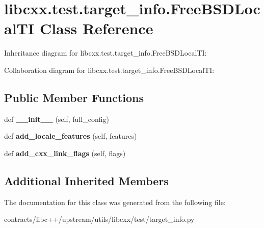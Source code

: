 \hypertarget{classlibcxx_1_1test_1_1target__info_1_1_free_b_s_d_local_t_i}{}\section{libcxx.\+test.\+target\+\_\+info.\+Free\+B\+S\+D\+Local\+TI Class Reference}
\label{classlibcxx_1_1test_1_1target__info_1_1_free_b_s_d_local_t_i}


Inheritance diagram for libcxx.\+test.\+target\+\_\+info.\+Free\+B\+S\+D\+Local\+TI\+:


Collaboration diagram for libcxx.\+test.\+target\+\_\+info.\+Free\+B\+S\+D\+Local\+TI\+:
\subsection*{Public Member Functions}
\begin{DoxyCompactItemize}
\item 
\mbox{\label{classlibcxx_1_1test_1_1target__info_1_1_free_b_s_d_local_t_i_ab0e7411a2cfe7884200d9e982c1601da}} 
def {\bfseries \+\_\+\+\_\+init\+\_\+\+\_\+} (self, full\+\_\+config)
\item 
\mbox{\label{classlibcxx_1_1test_1_1target__info_1_1_free_b_s_d_local_t_i_ab068a0dab886ccf4d4c497f139a28dac}} 
def {\bfseries add\+\_\+locale\+\_\+features} (self, features)
\item 
\mbox{\label{classlibcxx_1_1test_1_1target__info_1_1_free_b_s_d_local_t_i_a89b3e9b1199a8be322afe13126898371}} 
def {\bfseries add\+\_\+cxx\+\_\+link\+\_\+flags} (self, flags)
\end{DoxyCompactItemize}
\subsection*{Additional Inherited Members}


The documentation for this class was generated from the following file\+:\begin{DoxyCompactItemize}
\item 
contracts/libc++/upstream/utils/libcxx/test/target\+\_\+info.\+py\end{DoxyCompactItemize}

